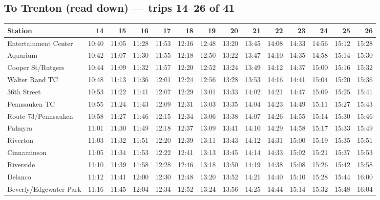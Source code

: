 \subsection*{To Trenton (read down) --- trips 14--26 of 41}
\begin{center}\footnotesize\setlength{\tabcolsep}{3pt}\begin{tabular}{@{}lrrrrrrrrrrrrr@{}}\toprule
Station & 14 & 15 & 16 & 17 & 18 & 19 & 20 & 21 & 22 & 23 & 24 & 25 & 26 \\\midrule
Entertainment Center & 10:40 & 11:05 & 11:28 & 11:53 & 12:16 & 12:48 & 13:20 & 13:45 & 14:08 & 14:33 & 14:56 & 15:12 & 15:28 \\
Aquarium & 10:42 & 11:07 & 11:30 & 11:55 & 12:18 & 12:50 & 13:22 & 13:47 & 14:10 & 14:35 & 14:58 & 15:14 & 15:30 \\
Cooper St/Rutgers & 10:44 & 11:09 & 11:32 & 11:57 & 12:20 & 12:52 & 13:24 & 13:49 & 14:12 & 14:37 & 15:00 & 15:16 & 15:32 \\
Walter Rand TC & 10:48 & 11:13 & 11:36 & 12:01 & 12:24 & 12:56 & 13:28 & 13:53 & 14:16 & 14:41 & 15:04 & 15:20 & 15:36 \\
36th Street & 10:53 & 11:22 & 11:41 & 12:07 & 12:29 & 13:01 & 13:33 & 14:02 & 14:21 & 14:47 & 15:09 & 15:25 & 15:41 \\
Pennsauken TC & 10:55 & 11:24 & 11:43 & 12:09 & 12:31 & 13:03 & 13:35 & 14:04 & 14:23 & 14:49 & 15:11 & 15:27 & 15:43 \\
Route 73/Pennsauken & 10:58 & 11:27 & 11:46 & 12:15 & 12:34 & 13:06 & 13:38 & 14:07 & 14:26 & 14:55 & 15:14 & 15:30 & 15:46 \\
Palmyra & 11:01 & 11:30 & 11:49 & 12:18 & 12:37 & 13:09 & 13:41 & 14:10 & 14:29 & 14:58 & 15:17 & 15:33 & 15:49 \\
Riverton & 11:03 & 11:32 & 11:51 & 12:20 & 12:39 & 13:11 & 13:43 & 14:12 & 14:31 & 15:00 & 15:19 & 15:35 & 15:51 \\
Cinnaminson & 11:05 & 11:34 & 11:53 & 12:22 & 12:41 & 13:13 & 13:45 & 14:14 & 14:33 & 15:02 & 15:21 & 15:37 & 15:53 \\
Riverside & 11:10 & 11:39 & 11:58 & 12:28 & 12:46 & 13:18 & 13:50 & 14:19 & 14:38 & 15:08 & 15:26 & 15:42 & 15:58 \\
Delanco & 11:12 & 11:41 & 12:00 & 12:30 & 12:48 & 13:20 & 13:52 & 14:21 & 14:40 & 15:10 & 15:28 & 15:44 & 16:00 \\
Beverly/Edgewater Park & 11:16 & 11:45 & 12:04 & 12:34 & 12:52 & 13:24 & 13:56 & 14:25 & 14:44 & 15:14 & 15:32 & 15:48 & 16:04 \\

\end{tabular}
\end{center}
